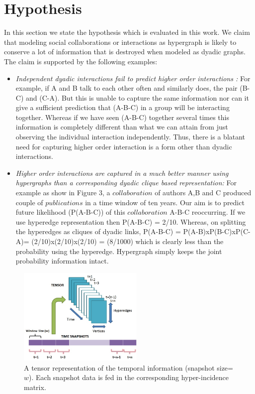\documentclass{sig-alternate}
\begin{document}
\section{Hypothesis}

In this section we state the hypothesis which is evaluated in this work. We claim that modeling social collaborations or interactions as hypergraph is likely to conserve a lot of information that is destroyed when modeled as dyadic graphs. The claim is supported by the following examples:

\begin{itemize}

\item \textit{Independent dyadic interactions fail to predict higher order interactions :} For example, if A and B talk to each other often and similarly does, the pair (B-C) and (C-A). But this is unable to capture the same information nor can it give a sufficient prediction that (A-B-C) in a group will be interacting together. Whereas if we have seen (A-B-C) together several times this information is completely different than what we can attain from just observing the individual interaction independently. Thus, there is a blatant need for capturing higher order interaction is a form other than dyadic interactions. 

\item \textit{Higher order interactions are captured in a much better manner using hypergraphs than a corresponding dyadic clique based representation:} For example as show in Figure 3, a $collaboration$ of authors A,B and C produced couple of $publications$ in a time window of ten years. Our aim is to predict future likelihood (P(A-B-C)) of this $collaboration$ A-B-C reoccurring. If we use hyperedge representation then P(A-B-C) = 2/10. Whereas, on splitting the hyperedges as cliques of dyadic links, P(A-B-C) = P(A-B)xP(B-C)xP(C-A)= (2/10)x(2/10)x(2/10) = (8/1000) which is clearly less than the probability using the hyperedge. Hypergraph simply keeps the joint probability information intact.
\end{itemize}

\begin{figure}[h!]
\centering
\includegraphics[width=60mm]{time_snap.jpg}
\caption{A tensor representation of the temporal information (snapshot size=$w$). Each snapshot data is fed in the corresponding hyper-incidence matrix.}
\label{overflow}
\vspace{-1.7em}
\end{figure}
\end{document}
